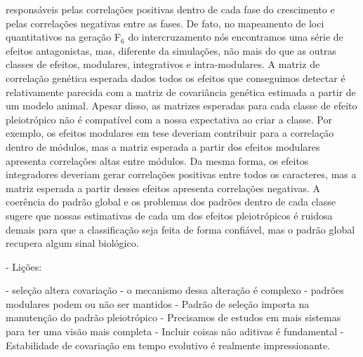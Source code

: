 \begin{refsection}
responsáveis pelas correlações positivas dentro de cada fase do crescimento e
pelas correlações negativas entre as fases. De fato, no mapeamento de loci
quantitativos na geração F$_6$ do intercruzamento nós encontramos uma série de
efeitos antagonistas, mas, diferente da simulações, não mais do que as outras
classes de efeitos, modulares, integrativos e intra-modulares. A matriz de
correlação genética esperada dados todos os efeitos que conseguimos detectar é
relativamente parecida com a matriz de covariância genética estimada a partir
de um modelo animal. Apesar disso, as matrizes esperadas para cada classe de
efeito pleiotrópico não é compatível com a nossa expectativa ao criar a
classe. Por exemplo, os efeitos modulares em tese deveriam contribuir para a
correlação dentro de módulos, mas a matriz esperada a partir dos efeitos
modulares apresenta correlações altas entre módulos. Da mesma forma, os
efeitos integradores deveriam gerar correlações positivas entre todos os
caracteres, mas a matriz esperada a partir desses efeitos apresenta
correlações negativas. A coerência do padrão global e os problemas dos padrões
dentro de cada classe sugere que nossas estimativas de cada um dos efeitos
pleiotrópicos é ruidosa demais para que a classificação seja feita de forma
confiável, mas o padrão global recupera algum sinal biológico.


- Lições:

	- seleção altera covariação
	- o mecanismo dessa alteração é complexo
		- padrões modulares podem ou não ser mantidos
		- Padrão de seleção importa na manutenção do padrão pleiotrópico
	- Precisamos de estudos em mais sistemas para ter uma visão mais completa
	- Incluir coisas não aditivas é fundamental
- Estabilidade de covariação em tempo evolutivo é realmente impressionante. 




\printbibliography


\end{refsection}